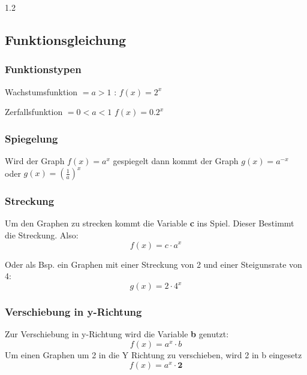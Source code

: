 \documentclass{article}
\newcommand{\Zeilenabstand}{1.2}
\newcommand{\absatz}{5mm}
\begin{document}
\begin{spacing}{\Zeilenabstand}
    \subsection{Funktionsgleichung}

    \subsubsection{Funktionstypen}

    \hspace{\absatz}Wachstumsfunktion $= a > 1$ : $f(x)= 2^{x}$

    \hspace{\absatz}Zerfallsfunktion $= 0 < a < 1$ $f(x)=0.2^{x}$

    \vspace{\absatz}

    \subsubsection{Spiegelung}

    Wird der Graph $f(x)=a^{x}$ gespiegelt dann kommt der Graph $g(x)=a^{-x}$ oder $g(x)=(\frac{1}{a})^{x}$

    \subsubsection{Streckung}

    Um den Graphen zu strecken kommt die Variable \textbf{c} ins Spiel. Dieser Bestimmt die Streckung. Also:
    \begin{equation*}
        f(x)=c\cdot a^{x}
    \end{equation*}

    Oder als Bsp. ein Graphen mit einer Streckung von 2 und einer Steigunsrate von 4: 
    \begin{equation*}
        g(x)=2\cdot 4^{x}
    \end{equation*}

    \subsubsection{Verschiebung in y-Richtung}

    Zur Verschiebung in y-Richtung wird die Variable \textbf{b} genutzt:
    \begin{equation*}
        f(x)=a^{x}\cdot b
    \end{equation*}
    Um einen Graphen um 2 in die Y Richtung zu verschieben, wird 2 in b eingesetz
    \begin{equation*}
        f(x)=a^{x}\cdot \mathbf{2}
    \end{equation*}


\end{spacing}
\end{document}
